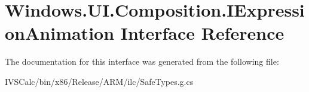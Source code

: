 \hypertarget{interface_windows_1_1_u_i_1_1_composition_1_1_i_expression_animation}{}\section{Windows.\+U\+I.\+Composition.\+I\+Expression\+Animation Interface Reference}
\label{interface_windows_1_1_u_i_1_1_composition_1_1_i_expression_animation}


The documentation for this interface was generated from the following file\+:\begin{DoxyCompactItemize}
\item 
I\+V\+S\+Calc/bin/x86/\+Release/\+A\+R\+M/ilc/Safe\+Types.\+g.\+cs\end{DoxyCompactItemize}
